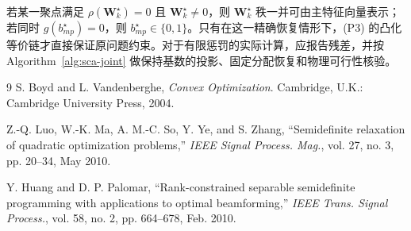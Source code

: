 \documentclass[12pt,a4paper]{article}
\newcommand{\mat}[1]{\mathbf{#1}}
\begin{document}
若某一聚点满足 $\rho(\mat{W}_k^\star)=0$ 且 $\mat{W}_k^\star\neq0$，则 $\mat{W}_k^\star$ 秩一并可由主特征向量表示；若同时 $g(b_{mp}^\star)=0$，则 $b_{mp}^\star\in\{0,1\}$。只有在这一精确恢复情形下，(P3) 的凸化等价链才直接保证原问题约束。对于有限惩罚的实际计算，应报告残差，并按 Algorithm~\ref{alg:sca-joint} 做保持基数的投影、固定分配恢复和物理可行性核验。

\begin{thebibliography}{9}
S. Boyd and L. Vandenberghe, \emph{Convex Optimization}. Cambridge, U.K.: Cambridge University Press, 2004.

Z.-Q. Luo, W.-K. Ma, A. M.-C. So, Y. Ye, and S. Zhang, ``Semidefinite relaxation of quadratic optimization problems,'' \emph{IEEE Signal Process. Mag.}, vol. 27, no. 3, pp. 20--34, May 2010.

Y. Huang and D. P. Palomar, ``Rank-constrained separable semidefinite programming with applications to optimal beamforming,'' \emph{IEEE Trans. Signal Process.}, vol. 58, no. 2, pp. 664--678, Feb. 2010.
\end{thebibliography}
\end{document}

